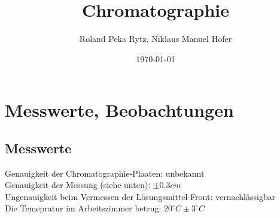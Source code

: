 \documentclass[11pt,paper=a4,final]{scrartcl}
\title{Chromatographie}
\author{Roland Peka Rytz, Niklaus Manuel Hofer}
\date{\today{}}
\begin{document}
\maketitle

\section{Messwerte, Beobachtungen}
\subsection{Messwerte}
Genauigkeit der Chromatographie-Plaaten: unbekannt\\
Genauigkeit der Messung (siehe unten): \( \pm 0.3cm\) \\
Ungenauigkeit beim Vermessen der L\"osungsmittel-Front: vernachl\"assigbar \\
Die Temepratur im Arbeitszimmer betrug: \(20^\circ C \pm 3^\circ C\)
\end{document}
